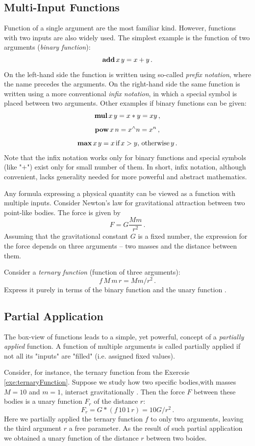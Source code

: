 \subsection{Multi-Input Functions}
Function of a single argument are the most familiar kind. However, functions with two inputs are also widely used. The simplest example is the function of two arguments (\emph{binary function}):
\[
\textrm{\bf {add}}\,x\,y = x + y\,.
\]
On the left-hand side the function is written using so-called \emph{prefix notation}, where the name precedes the arguments. On the right-hand side the same function is written using a more conventional \emph{infix notation}, in which a special symbol is placed between two arguments. Other examples if binary functions can be given:
\[
\textrm{\bf {mul}}\,x\,y = x * y=xy\,,
\]
\[
\textrm{\bf {pow}}\,x\,n = x^\wedge n =x^n\,,
\]
\[
\textrm{\bf {max}}\,x\,y = x\,\textrm{if}\,x>y,\,\textrm{otherwise}\,y\,.
\]
Note that the infix notation works only for binary functions and special symbols (like "$+$") exist only for small number of them. In short, infix notation, although convenient, lacks generality needed for more powerful and abstract mathematics.

Any formula expressing a physical quantity can be viewed as a function with multiple inputs. Consider Newton's law for gravitational attraction between two point-like bodies. The force is given by
\[
F = G\frac{Mm}{r^2}\,.
\]
Assuming that the gravitational constant $G$ is a fixed number, the expression for the force depends on three arguments -- two masses and the distance between them. 
\begin{exercise}
	Consider a \emph{ternary function} (function of three arguments):
	\[
	f\,M\,m\,r=Mm/r^2\,.
	\]
	Express it purely in terms of the binary function  and the unary function .
	\label{exe:ternaryFunction}
\end{exercise}

\subsection{Partial Application}
The box-view of functions leads to a simple, yet powerful, concept of a \emph{partially applied} function. A function of multiple arguments is called partially applied if not all its "inputs" are "filled" (i.e. assigned fixed values). 

Consider, for instance, the ternary function from the Exercsie \ref{exe:ternaryFunction}. Suppose we study how two specific bodies,with masses $M=10$ and $m=1$, interact gravitationally . Then the force $F$ between these bodies is a unary function $F_r$ of the distance $r$:
\[
F_r = G*(f\,10\,1\,r) = 10G/r^2\,.
\]
Here we partially applied the ternary function $f$ to only two arguments, leaving the third argument $r$ a free parameter. As the result of such partial application we obtained a unary function of the distance $r$ between two boides.

